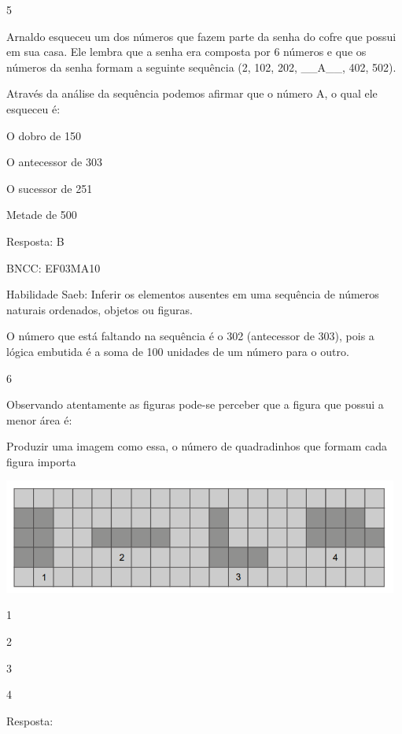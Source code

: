 \begin{escolha}
\num{5}

Arnaldo esqueceu um dos números que fazem parte da senha do cofre que
possui em sua casa. Ele lembra que a senha era composta por 6 números e
que os números da senha formam a seguinte sequência (2, 102, 202,
\_\_A\_\_, 402, 502).

Através da análise da sequência podemos afirmar que o número A, o qual
ele esqueceu é:

\begin{escolha}

\item
  O dobro de 150
\item
  O antecessor de 303
\item
  O sucessor de 251
\item
  Metade de 500
\end{escolha}

Resposta: B

BNCC: EF03MA10

Habilidade Saeb: Inferir os elementos ausentes em uma sequência de
números naturais ordenados, objetos ou figuras.

O número que está faltando na sequência é o 302 (antecessor de 303),
pois a lógica embutida é a soma de 100 unidades de um número para o
outro.

\num{6}

Observando atentamente as figuras pode-se perceber que a figura que
possui a menor área é:

Produzir uma imagem como essa, o número de quadradinhos que formam cada
figura importa

\includegraphics[width=5.12179in,height=1.48342in]{media/image133.png}

\begin{escolha}

\item
  1
\item
  2
\item
  3
\item
  4
\end{escolha}

Resposta:


\end{escolha}
